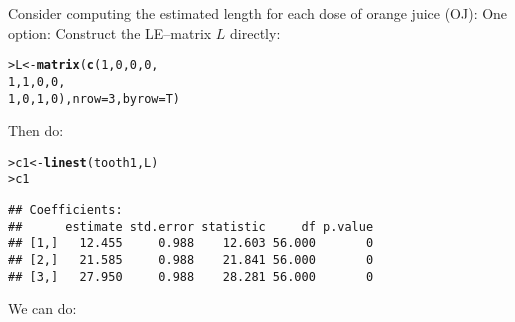 \documentclass[11pt]{article}\usepackage[]{graphicx}\usepackage[]{color}
\makeatletter
\newcommand{\hlnum}[1]{\textcolor[rgb]{0.686,0.059,0.569}{#1}}%
\newcommand{\hlstd}[1]{\textcolor[rgb]{0.345,0.345,0.345}{#1}}%
\newcommand{\hlkwb}[1]{\textcolor[rgb]{0.69,0.353,0.396}{#1}}%
\newcommand{\hlkwc}[1]{\textcolor[rgb]{0.333,0.667,0.333}{#1}}%
\newcommand{\hlkwd}[1]{\textcolor[rgb]{0.737,0.353,0.396}{\textbf{#1}}}%
\newenvironment{kframe}{%
 \def\at@end@of@kframe{}%
 \ifinner\ifhmode%
  \def\at@end@of@kframe{\end{minipage}}%
  \begin{minipage}{\columnwidth}%
 \fi\fi%
 \def\FrameCommand##1{\hskip\@totalleftmargin \hskip-\fboxsep
 \colorbox{shadecolor}{##1}\hskip-\fboxsep
     \hskip-\linewidth \hskip-\@totalleftmargin \hskip\columnwidth}%
 \MakeFramed {\advance\hsize-\width
   \@totalleftmargin\z@ \linewidth\hsize
   \@setminipage}}%
 {\par\unskip\endMakeFramed%
 \at@end@of@kframe}
\newenvironment{knitrout}{}{} %
\renewenvironment{knitrout}{
  \begin{oldknitrout}
    \footnotesize
    \topsep=0pt
}{
  \end{oldknitrout}
}
\makeatother
\begin{document}
Consider computing the estimated length for each dose of orange juice (OJ):
One option: Construct the LE--matrix $L$ directly:

\begin{knitrout}
\color{fgcolor}\begin{kframe}
\begin{alltt}
\hlstd{> }\hlstd{L} \hlkwb{<-} \hlkwd{matrix}\hlstd{(}\hlkwd{c}\hlstd{(}\hlnum{1}\hlstd{,} \hlnum{0}\hlstd{,} \hlnum{0}\hlstd{,} \hlnum{0}\hlstd{,}
\hlstd{  }              \hlnum{1}\hlstd{,} \hlnum{1}\hlstd{,} \hlnum{0}\hlstd{,} \hlnum{0}\hlstd{,}
\hlstd{  }              \hlnum{1}\hlstd{,} \hlnum{0}\hlstd{,} \hlnum{1}\hlstd{,} \hlnum{0}\hlstd{),} \hlkwc{nrow}\hlstd{=}\hlnum{3}\hlstd{,} \hlkwc{byrow}\hlstd{=T)}
\end{alltt}
\end{kframe}
\end{knitrout}

Then do:

\begin{knitrout}
\color{fgcolor}\begin{kframe}
\begin{alltt}
\hlstd{> }\hlstd{c1} \hlkwb{<-} \hlkwd{linest}\hlstd{(tooth1, L)}
\hlstd{> }\hlstd{c1}
\end{alltt}
\begin{verbatim}
## Coefficients:
##      estimate std.error statistic     df p.value
## [1,]   12.455     0.988    12.603 56.000       0
## [2,]   21.585     0.988    21.841 56.000       0
## [3,]   27.950     0.988    28.281 56.000       0
\end{verbatim}
\end{kframe}
\end{knitrout}

We can do:
\end{document}

